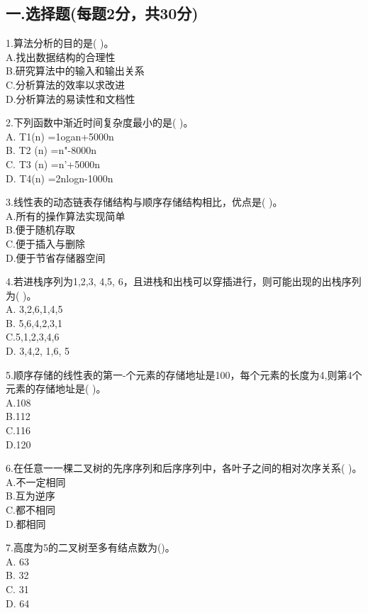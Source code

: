 
\subsection{一.选择题(每题2分，共30分)}
1.算法分析的目的是( )。 \\
A.找出数据结构的合理性 \\
B.研究算法中的输入和输出关系 \\
C.分析算法的效率以求改进 \\
D.分析算法的易读性和文档性

2.下列函数中渐近时间复杂度最小的是( )。 \\
A. T1(n) =1ogan+5000n \\
B. T2 (n) =n"-8000n \\
C. T3 (n) =n'+5000n \\
D. T4(n) =2nlogn-1000n

3.线性表的动态链表存储结构与顺序存储结构相比，优点是( )。 \\
A.所有的操作算法实现简单 \\
B.便于随机存取 \\
C.便于插入与删除 \\
D.便于节省存储器空间

4.若进栈序列为1,2,3, 4,5, 6，且进栈和出栈可以穿插进行，则可能出现的出栈序列为( )。 \\
A. 3,2,6,1,4,5 \\
B. 5,6,4,2,3,1 \\
C.5,1,2,3,4,6 \\
D. 3,4,2, 1,6, 5

5.顺序存储的线性表的第一-个元素的存储地址是100，每个元素的长度为4,则第4个元素的存储地址是( )。 \\
A.108 \\
B.112 \\
C.116 \\
D.120

6.在任意一一棵二叉树的先序序列和后序序列中，各叶子之间的相对次序关系( )。 \\
A.不一定相同 \\
B.互为逆序 \\
C.都不相同 \\
D.都相同

7.高度为5的二叉树至多有结点数为()。 \\
A. 63 \\
B. 32 \\
C. 31 \\
D. 64

